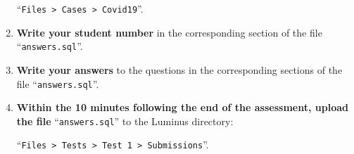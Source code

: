 \documentclass[10pt,a4paper,answers]{exam}
\begin{document}
\begin{enumerate}
``\verb+Files > Cases > Covid19+''.

\item {\bf Write your  student number} in the corresponding section of the file ``\verb+answers.sql+''.

\item {\bf Write  your answers} to the questions in the corresponding sections of the file ``\verb+answers.sql+''.

\item {\bf Within the 10 minutes following the end of the assessment, upload the file} ``\verb+answers.sql+'' to the Luminus directory:

``\verb+Files > Tests > Test 1 > Submissions+''.
\end{enumerate}
\vspace{1cm}

\pagebreak
\end{document}
